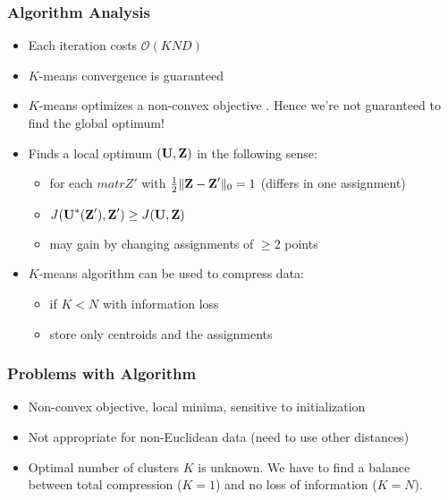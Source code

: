 \subsubsection{Algorithm Analysis}
\begin{itemize}
\item Each iteration costs \(\mathcal{O}(KND)\)

\item \(K\)-means convergence is guaranteed 

\item \(K\)-means optimizes a non-convex objective . Hence we're not guaranteed to find the global optimum!

\item Finds a local optimum \((\boldsymbol{\mathrm{U}}, \boldsymbol{\mathrm{Z}})\) in the following sense:
\begin{itemize}
\item for each \(matr{Z}'\) with \(\frac{1}{2} \| \boldsymbol{\mathrm{Z}} - \boldsymbol{\mathrm{Z}}' \|_0 = 1\) (differs in one assignment)
\item \(J(\boldsymbol{\mathrm{U}}^\ast (\boldsymbol{\mathrm{Z}}'), \boldsymbol{\mathrm{Z}}') \geq J(\boldsymbol{\mathrm{U}}, \boldsymbol{\mathrm{Z}})\)
\item may gain by changing assignments of \(\geq 2\) points
\end{itemize}

\item \(K\)-means algorithm can be used to compress data:
\begin{itemize}
\item if \(K < N\) with information loss
\item store only centroids and the assignments
\end{itemize}
\end{itemize}

\subsubsection{Problems with Algorithm}
\begin{itemize}
\item Non-convex objective, local minima, sensitive to initialization
\item Not appropriate for non-Euclidean data (need to use other distances)
\item Optimal number of clusters \(K\) is unknown. We have to find a balance between total compression (\(K = 1\)) and no loss of information (\(K = N\)).
\end{itemize}

